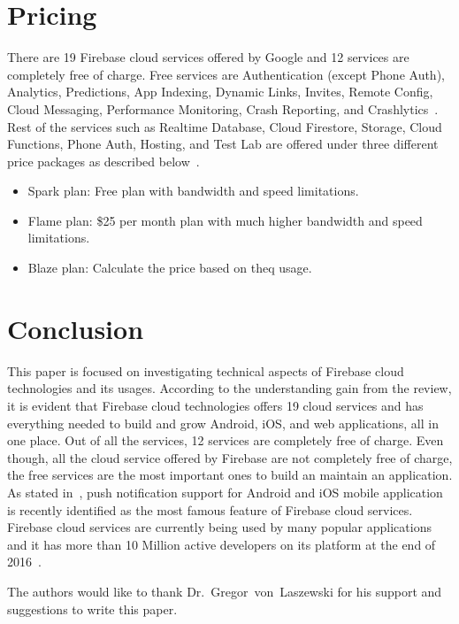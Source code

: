\section{Pricing} 

There are 19 Firebase cloud services offered by Google and 12 services
are completely free of charge. Free services are Authentication
(except Phone Auth), Analytics, Predictions, App Indexing, Dynamic
Links, Invites, Remote Config, Cloud Messaging, Performance
Monitoring, Crash Reporting, and
Crashlytics~\cite{hid-sp18-409-www-firebase-pricing}. Rest of the
services such as Realtime Database, Cloud Firestore, Storage, Cloud
Functions, Phone Auth, Hosting, and Test Lab are offered under three
different price packages as described
below~\cite{hid-sp18-409-www-firebase-pricing}.

\begin{itemize} 

\item Spark plan: Free plan with bandwidth and speed
	limitations. 

\item Flame plan: \$25 per month plan with much higher 
	bandwidth
	and speed limitations. 

\item Blaze plan: Calculate the price based on theq
  usage. 

\end{itemize}

\section{Conclusion} This paper is focused on investigating
technical aspects of Firebase cloud technologies and its
usages. According to the understanding gain from the review, it is
evident that Firebase cloud technologies offers 19 cloud services and
has everything needed to build and grow Android, iOS, and web
applications, all in one place. Out of all the services, 12 services
are completely free of charge. Even though, all the cloud service
offered by Firebase are not completely free of charge, the free
services are the most important ones to build an maintain an
application. As stated in~\cite{hid-sp18-409-www-firebase}, push
notification support for Android and iOS mobile application is
recently identified as the most famous feature of Firebase cloud
services. Firebase cloud services are currently being used by many
popular applications and it has more than 10 Million active developers
on its platform at the end of 2016~\cite{hid-sp18-409-www-firebase}.

\begin{acks}
	
	The authors would like to thank Dr.~Gregor~von~Laszewski for his
  support and suggestions to write this paper.
	
\end{acks}


 

